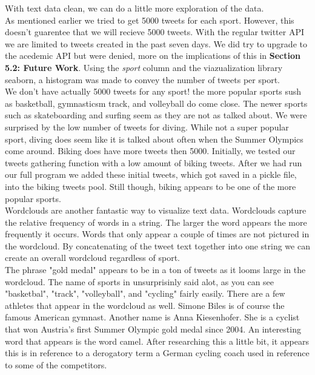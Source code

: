 \documentclass[12pt]{article}
\begin{document}
            With text data clean, we can do a little more exploration of the data. \\

            As mentioned earlier we tried to get 5000 tweets for each sport. However, this doesn't guarentee that we will recieve 5000 tweets. With the regular
            twitter API we are limited to tweets created in the past seven days. We did try to upgrade to the acedemic API but were denied, more on the implications 
            of this in \textbf{Section 5.2: Future Work}. Using the \textit{sport} column and the viazualization library seaborn, a histogram was made to convey the number of 
            tweets per sport. \\

            We don't have actually 5000 tweets for any sport! the more popular sports sush as basketball, gymnasticsm track, and volleyball do come close. The newer
            sports such as skateboarding and surfing seem as they are not as talked about. We were surprised by the low number of tweets for diving. While not a 
            super popular sport, diving does seem like it is talked about often when the Summer Olympics come around. Biking does have more tweets then 5000. 
            Initially, we tested our tweets gathering function with a low amount of biking tweets. After we had run our full program we added these initial tweets, 
            which got saved in a pickle file, into the biking tweets pool. Still though, biking appears to be one of the more popular sports. \\

            Wordclouds are another fantastic way to visualize text data. Wordclouds capture the relative frequency of words in a string. The larger the word appears 
            the more frequently it occurs. Words that only appear a couple of times are not pictured in the wordcloud. By concatenating of the tweet text together 
            into one string we can create an overall wordcloud regardless of sport.\\ 

            The phrase "gold medal" appears to be in a ton of tweets as it looms large in the wordcloud. The name of sports in unsurprisinly said alot, as you can 
            see "basketbal", "track", "volleyball",  and "cycling" fairly easily. There are a few athletes that appear in the wordcloud as well. Simone Biles is of 
            course the famous American gymnast. Another name is Anna Kiesenhofer. She is a cyclist that won Austria's first Summer Olympic gold medal since 2004. An 
            interesting word that appears is the word camel. After researching this a little bit, it appears this is in reference to a derogatory term a German 
            cycling coach used in reference to some of the competitors. \\
\end{document}
